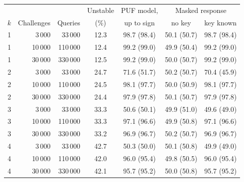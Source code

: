 \begin{tabular}{crrcccc}
\toprule
 & & & Unstable & PUF model, & \multicolumn{2}{c}{Masked response} \\
$k$ & Challenges & Queries & (\%) & up to sign & no key & key known \\
\midrule
1 & 3\,000 & 33\,000 & 12.3 & 98.7 (98.4) & 50.1 (50.7) & 98.7 (98.4) \\
1 & 10\,000 & 110\,000 & 12.4 & 99.2 (99.0) & 49.9 (50.4) & 99.2 (99.0) \\
1 & 30\,000 & 330\,000 & 12.5 & 99.2 (99.0) & 50.0 (50.7) & 99.2 (99.0) \\
\midrule
2 & 3\,000 & 33\,000 & 24.7 & 71.6 (51.7) & 50.2 (50.7) & 70.4 (45.9) \\
2 & 10\,000 & 110\,000 & 24.5 & 98.1 (97.7) & 50.0 (50.9) & 98.1 (97.7) \\
2 & 30\,000 & 330\,000 & 24.4 & 97.9 (97.8) & 50.1 (50.7) & 97.9 (97.8) \\
\midrule
3 & 3\,000 & 33\,000 & 33.3 & 50.6 (50.1) & 49.9 (51.0) & 49.6 (49.0) \\
3 & 10\,000 & 110\,000 & 33.3 & 97.1 (96.6) & 49.9 (50.8) & 97.1 (96.6) \\
3 & 30\,000 & 330\,000 & 33.2 & 96.9 (96.7) & 50.2 (50.7) & 96.9 (96.7) \\
\midrule
4 & 3\,000 & 33\,000 & 42.7 & 50.3 (50.0) & 50.1 (50.8) & 49.9 (49.0) \\
4 & 10\,000 & 110\,000 & 42.0 & 96.0 (95.4) & 49.8 (50.5) & 96.0 (95.4) \\
4 & 30\,000 & 330\,000 & 42.1 & 95.7 (95.2) & 50.0 (50.8) & 95.7 (95.2) \\
\bottomrule
\end{tabular}
